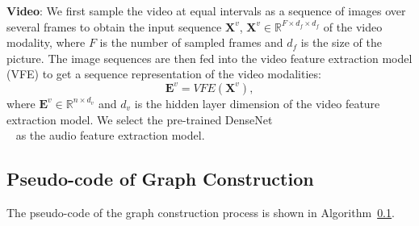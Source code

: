 \documentclass[11pt]{article}
\begin{document}
\textbf{Video}: We first sample the video at equal intervals as a sequence of images over several frames to obtain the input sequence $\bm{X}^v$, $\bm{X}^v \in \mathbb{R}^{F \times d_f \times d_f }$ of the video modality, where $F$ is the number of sampled frames and $d_f$ is the size of the picture.
The image sequences are then fed into the video feature extraction model (VFE) to get a sequence representation of the video modalities:
\begin{equation}
\bm{E}^v = VFE(\bm{X}^v),
\end{equation}
where $\bm{E}^v \in \mathbb{R}^{n \times d_v}$ and $d_v$ is the hidden layer dimension of the video feature extraction model.
We select the pre-trained DenseNet\\~\cite{DenseNet} as the audio feature extraction model.

\subsection{Pseudo-code of Graph Construction}
\label{appendix:pseudo-code}

The pseudo-code of the graph construction process is shown in Algorithm~\ref{appendix:pseudo-code}.
\end{document}
